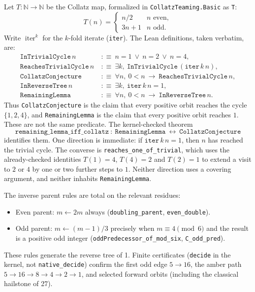 \documentclass[11pt]{article}
\begin{document}
Let $T:\mathbb{N}\to\mathbb{N}$ be the Collatz map, formalized in \texttt{CollatzTeaming.Basic} as \texttt{T}:
\[
T(n)=\begin{cases}
n/2 & n\text{ even},\\
3n+1 & n\text{ odd}.
\end{cases}
\]
Write $\operatorname{iter}^k$ for the $k$-fold iterate (\texttt{iter}). The Lean definitions, taken verbatim, are:
\begin{align*}
\texttt{InTrivialCycle}\,n
&\ :\equiv\
n=1\ \lor\ n=2\ \lor\ n=4,\\
\texttt{ReachesTrivialCycle}\,n
&\ :\equiv\
\exists k,\ \texttt{InTrivialCycle}\,(\texttt{iter}\,k\,n),\\
\texttt{CollatzConjecture}
&\ :\equiv\
\forall n,\ 0<n\ \to\ \texttt{ReachesTrivialCycle}\,n,\\
\texttt{InReverseTree}\,n
&\ :\equiv\
\exists k,\ \texttt{iter}\,k\,n=1,\\
\texttt{RemainingLemma}
&\ :\equiv\
\forall n,\ 0<n\ \to\ \texttt{InReverseTree}\,n.
\end{align*}
Thus \texttt{CollatzConjecture} is the claim that every positive orbit reaches the cycle $\{1,2,4\}$, and \texttt{RemainingLemma} is the claim that every positive orbit reaches $1$. These are not the same predicate. The kernel-checked theorem
\[
\texttt{remaining\_lemma\_iff\_collatz}\ :\ \texttt{RemainingLemma}\ \leftrightarrow\ \texttt{CollatzConjecture}
\]
identifies them. One direction is immediate: if $\texttt{iter}\,k\,n=1$, then $n$ has reached the trivial cycle. The converse is \texttt{reaches\_one\_of\_trivial}, which uses the already-checked identities $T(1)=4$, $T(4)=2$ and $T(2)=1$ to extend a visit to $2$ or $4$ by one or two further steps to $1$. Neither direction uses a covering argument, and neither inhabits \texttt{RemainingLemma}.

The inverse parent rules are total on the relevant residues:
\begin{itemize}
\item Even parent: $m\leftarrow 2m$ always (\texttt{doubling\_parent}, \texttt{even\_double}).
\item Odd parent: $m\leftarrow (m-1)/3$ precisely when $m\equiv 4\pmod 6$ and the result is a positive odd integer (\texttt{oddPredecessor\_of\_mod\_six}, \texttt{C\_odd\_pred}).
\end{itemize}
These rules generate the reverse tree of 1. Finite certificates (\texttt{decide} in the kernel, not \texttt{native\_decide}) confirm the first odd edge $5\to 16$, the amber path $5\to 16\to 8\to 4\to 2\to 1$, and selected forward orbits (including the classical hailstone of 27).
\end{document}
